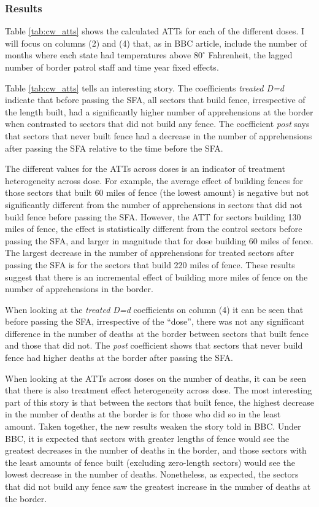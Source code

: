 \documentclass[titlepage]{article}
\theoremstyle{plain}
\theoremstyle{plain}
\begin{document}
\subsubsection*{Results}

Table \ref{tab:cw_atts} shows the calculated ATTs for each of the different doses. I will focus on columns (2) and (4) that, as in BBC article, include the number of months where each state had temperatures above $80^{\circ}$ Fahrenheit, the lagged number of border patrol staff and time year fixed effects.



Table \ref{tab:cw_atts} tells an interesting story. The coefficients \textit{treated D=d} indicate that before passing the SFA, all sectors that build fence, irrespective of the length built, had a significantly higher number of apprehensions at the border when contrasted to sectors that did not build any fence. The coefficient \textit{post} says that sectors that never built fence had a decrease in the number of apprehensions after passing the SFA relative to the time before the SFA.

The different values for the ATTs across doses is an indicator of treatment heterogeneity across dose. For example, the average effect of building fences for those sectors that built 60 miles of fence (the lowest amount) is negative but not significantly different from the number of apprehensions in sectors that did not build fence before passing the SFA. However, the ATT for sectors building 130 miles of fence, the effect is statistically different from the control sectors before passing the SFA, and larger in magnitude that for dose building 60 miles of fence. The largest decrease in the number of apprehensions for treated sectors after passing the SFA is for the sectors that build 220 miles of fence. These results suggest that there is an incremental effect of building more miles of fence on the number of apprehensions in the border.

When looking at the \textit{treated D=d} coefficients on column (4) it can be seen that before passing the SFA, irrespective of the \enquote{dose}, there was not any significant difference in the number of deaths at the border between sectors that built fence and those that did not. The \textit{post} coefficient shows that sectors that never build fence had higher deaths at the border after passing the SFA.

When looking at the ATTs across doses on the number of deaths, it can be seen that there is also treatment effect heterogeneity across dose. The most interesting part of this story is that between the sectors that built fence, the highest decrease in the number of deaths at the border is for those who did so in the least amount. Taken together, the new results weaken the story told in BBC. Under BBC, it is expected that sectors with greater lengths of fence would see the greatest decreases in the number of deaths in the border, and those sectors with the least amounts of fence built (excluding zero-length sectors) would see the lowest decrease in the number of deaths. Nonetheless, as expected, the sectors that did not build any fence saw the greatest increase in the number of deaths at the border.
\end{document}

